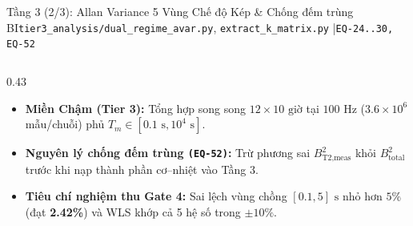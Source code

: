 \documentclass[aspectratio=169,8pt]{beamer}
\begin{document}
\begin{frame}{Tầng 3 (2/3): Allan Variance 5 Vùng Chế độ Kép \& Chống đếm trùng BI}{\texttt{tier3\_analysis/dual\_regime\_avar.py}, \texttt{extract\_k\_matrix.py} \enspace|\enspace \texttt{EQ-24..30, EQ-52}}
\begin{columns}[T]
\begin{column}{0.43\textwidth}
\begin{remarkbox}
\begin{itemize}
        \item \textbf{Miền Chậm (Tier 3):} Tổng hợp song song $12\times 10\text{ giờ}$ tại $100\text{ Hz}$ ($3.6\times 10^6$ mẫu/chuỗi) phủ $T_m\in[0.1\text{ s}, 10^4\text{ s}]$.
        \item \textbf{Nguyên lý chống đếm trùng \texttt{(EQ-52)}:} Trừ phương sai $B_{\text{T2,meas}}^2$ khỏi $B_{\text{total}}^2$ trước khi nạp thành phần cơ–nhiệt vào Tầng 3.
        \item \textbf{Tiêu chí nghiệm thu Gate 4:} Sai lệch vùng chồng $[0.1,5]\text{ s}$ nhỏ hơn $5\%$ (đạt \textbf{2.42\%}) và WLS khớp cả 5 hệ số trong $\pm 10\%$.
      \end{itemize}
    \end{remarkbox}
  \end{column}
\end{columns}
\end{frame}
\end{document}
